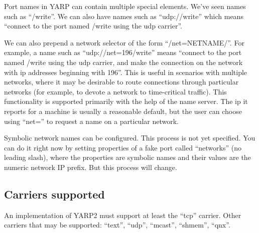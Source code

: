 \documentclass[a4]{article}
\begin{document}
Port names in YARP can contain multiple special elements.
We've seen names such as ``/write''.  We can also have
names such as ``udp://write'' which means ``connect
to the port named /write using the udp carrier''.

We can also prepend a network selector of the form
``/net=NETNAME/''.  For example, a name such as
``udp://net=196/write'' means ``connect to the 
port named /write using the udp carrier, and make the
connection on the network with ip addresses beginning with
196''.
%
This is useful in scenarios with multiple networks, where it may be
desirable to route connections through particular networks (for
example, to devote a network to time-critical traffic).  This
functionality is supported primarily with the help of the name server.
The ip it reports for a machine is usually a reasonable default, but
the user can choose using ``net='' to request a name on a particular
network.

Symbolic network names can be configured.  This process is not yet
specified.  You can do it right now by setting properties of a fake
port called ``networks'' (no leading slash), where the properties are
symbolic names and their values are the numeric network IP prefix.
But this process will change.







\subsection{Carriers supported}

An implementation of YARP2 must support at least the ``tcp'' carrier.
Other carriers that may be supported:
``text'', ``udp'', ``mcast'', ``shmem'', ``qnx''.
\end{document}
